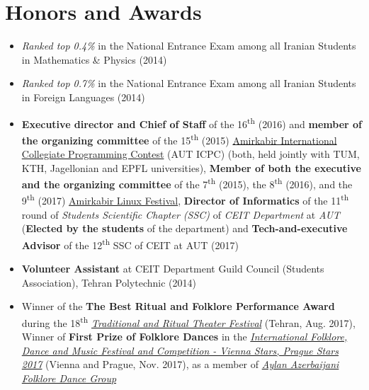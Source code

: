 \documentclass[a4paper,10pt]{article}
\begin{document}
\section{Honors and Awards}
\begin{itemize}

    \item \emph{Ranked top 0.4\%} in the National Entrance Exam among all Iranian Students in Mathematics \& Physics (2014)
    
    \item \emph{Ranked top 0.7\%} in the National Entrance Exam among all Iranian Students in Foreign Languages (2014)
    
    \item \textbf{Executive director and Chief of Staff} of the 16\textsuperscript{th} (2016) and \textbf{member of the organizing committee} of the 15\textsuperscript{th} (2015) \href{http://icpc.aut.ac.ir/}{Amirkabir International Collegiate Programming Contest} (AUT ICPC) (both, held jointly with TUM, KTH, Jagellonian and EPFL universities), \textbf{Member of both the executive and the organizing committee} of the 7\textsuperscript{th} (2015), the 8\textsuperscript{th} (2016), and the 9\textsuperscript{th} (2017) \href{http://linuxfest.ir}{Amirkabir Linux Festival}, \textbf{Director of Informatics} of the 11\textsuperscript{th} round of \textit{Students Scientific Chapter (SSC)} of \textit{CEIT Department} at \textit{AUT} (\textbf{Elected by the students} of the department) and \textbf{Tech-and-executive Advisor} of the 12\textsuperscript{th} SSC of CEIT at AUT (2017)
    
    
    \item \textbf{Volunteer Assistant} at CEIT Department Guild Council (Students Association), Tehran Polytechnic (2014)
    
    \item Winner of the \textbf{The Best Ritual and Folklore Performance Award} during the 18\textsuperscript{th} \textit{\href{http://iran-tt.ir/}{Traditional and Ritual Theater Festival}} (Tehran, Aug. 2017), Winner of \textbf{First Prize of Folklore Dances} in the \textit{\href{http://eaff.eu/en}{International Folklore, Dance and Music Festival and Competition - Vienna Stars, Prague Stars 2017}} (Vienna and Prague, Nov. 2017), as a member of \textit{\href{https://aylandance.com}{Aylan Azerbaijani Folklore Dance Group}}

\end{itemize}
\end{document}
